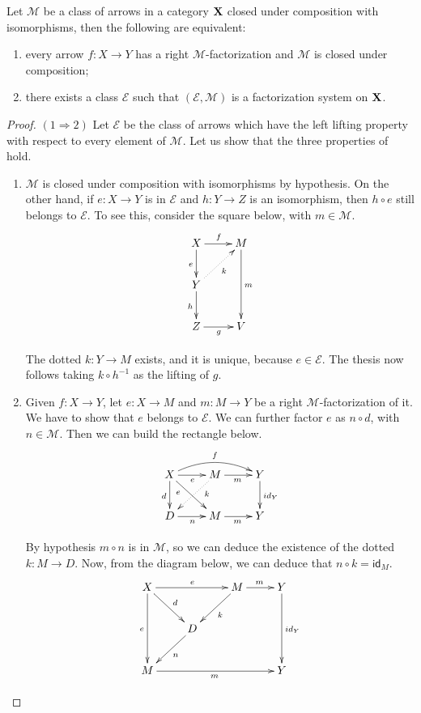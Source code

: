 \documentclass[a4paper,UKenglish,cleveref,pdftex,thm-restate,numberwithinsect]{lipics-v2021}
\newcommand{\id}[1]{\mathsf{id}_{#1}}
\def\X{\textbf {\textup{X}}}
\def\Y{\textbf {\textup{Y}}}
\def\Z{\textbf {\textup{Z}}}
\begin{document}
\begin{lemma}\label{lem:fact}Let $\mathcal{M}$ be a class of arrows in a category $\X$ closed under composition with isomorphisms, then the following are equivalent:
	\begin{enumerate}
		\item every arrow $f\colon X\to Y$ has a right $\mathcal{M}$-factorization and $\mathcal{M}$ is closed under composition;
		\item there exists a class $\mathcal{E}$ such that $(\mathcal{E}, \mathcal{M})$ is a factorization system on $\X$.
	\end{enumerate}
\end{lemma}
\begin{proof} $(1\Rightarrow 2)$ Let $\mathcal{E}$ be the class of arrows which have the left lifting property with respect to every element of $\mathcal{M}$. Let us show that the three properties of  hold.
	
	\begin{enumerate}
		\item $\mathcal{M}$ is closed under composition with isomorphisms by hypothesis. On the other hand, if $e\colon X\to Y$ is in $\mathcal{E}$ and $h\colon Y \to Z$ is an isomorphism, then $h\circ e$ still belongs to $\mathcal{E}$. To see this, consider the square below, with $m\in \mathcal{M}$.
		\[\xymatrix{X\ar[r]^{f} \ar[d]_{e}& M\ar[dd]^{m}  \\Y \ar@{.>}[ur]_{k}\ar[d]_h \\Z \ar[r]_{g}& V}\]
		
		The dotted $k\colon Y\to M$ exists, and it is unique, because $e\in \mathcal{E}$. The thesis now follows taking $k\circ h^{-1}$ as the lifting of $g$. 
		
		\item Given $f\colon X\to Y$, let $e\colon X\to M$ and $m\colon M\to Y$ be a right $\mathcal{M}$-factorization of it. We have to show that $e$ belongs to $\mathcal{E}$. We can further factor $e$ as $n\circ d$, with $n\in \mathcal{M}$. Then we can build the rectangle below.
		\[\xymatrix{X  \ar[dr]_(.3){e}\ar[d]_{d} \ar@/^.4cm/[rr]^{f}\ar[r]_{e} & M \ar@{.>}[dl]^(.3){k} \ar[r]_{m} & Y \ar[d]^{\id{Y}}\\
			D \ar[r]_{n} & M \ar[r]_{m}& Y}\]
		
		By hypothesis $m\circ n$ is in $\mathcal{M}$, so we can deduce the existence of the dotted $k\colon M\to D$.   Now, from the diagram below, we can deduce that $n\circ k=\id{M}$.
		\[\xymatrix{X \ar[rr]^{e} \ar[dr]^{d}\ar[dd]_{e}& &M \ar[r]^{m}\ar[dl]^{k}& Y \ar[dd]^{\id{Y}}\\ & D\ar[dl]^{n}\\M\ar[rrr]_{m}&&&Y}\]
		

\end{enumerate}
\end{proof}
\end{document}
